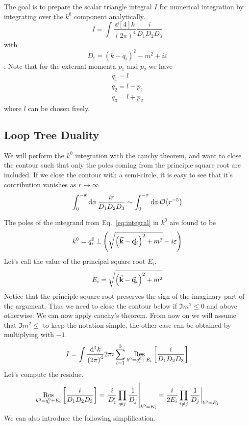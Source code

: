 The goal is to prepare the scalar triangle integral $I$ for numerical integration by integrating over the $k^0$ component analytically.
\begin{equation}
    I = \int \frac{\dd[4]{k}}{{(2\pi)}^4} \frac{i}{D_1D_2D_3} \label{eq:integral}
\end{equation}
with
\begin{equation}
    D_i = {(k-q_i)}^2-m^2+i\varepsilon \label{eq:denom}
\end{equation}.
Note that for the external momenta $p_1$ and $p_2$ we have
\begin{align}
    q_1 = l\\
    q_2 = l - p_1\\
    q_3 = l + p_2
\end{align}
where $l$ can be chosen freely.
\subsection{Loop Tree Duality}
We will perform the $k^0$ integration with the cauchy theorem, and want to close the contour such that only the poles coming from the principle square root are included. If we close the contour with a semi-circle, it is easy to see that it's contribution vanishes as $r \to \infty$
\begin{equation}
    \int_{0}^{-\pi} \dd{\phi} \frac{ir}{D_1D_2D_3} \sim \int_{0}^{-\pi} \dd{\phi} \order{r^{-5}}
\end{equation}

The poles of the integrand from Eq.~\eqref{eq:integral} in $k^0$ are found to be
\begin{equation}
    k^0 = q_i^0 \pm \qty(\sqrt{{\qty(\va{k}-\va{q}_i)}^2+m^2}-i\varepsilon)
\end{equation}
Let's call the value of the principal square root $E_i$.
\begin{equation}
    E_i = \sqrt{{\qty(\va{k}-\va{q}_i)}^2 + m^2}
\end{equation}
Notice that the principle square root preserves the sign of the imaginary part of the argument. Thus we need to close the contour below if $\Im{m^2}\leq0$ and above otherwise. We can now apply cauchy's theorem. From now on we will assume that $\Im{m^2}\leq$ to keep the notation simple, the other case can be obtained by multiplying with $-1$.
\begin{equation}
    I = \int \frac{\dd[4]{k}}{{(2\pi)}^4} 2\pi i \sum_{i= 1}^{3} \On{Res}_{k^0 = q^0_i + E_i}\qty[\frac{i}{D_1D_2D_3}] \label{eq:cauchy}
\end{equation}
Let's compute the residue.
\begin{equation}
    \On{Res}_{k^0 = q^0_i + E_i}\qty[\frac{i}{D_1D_2D_3}] = \eval{\frac{i}{D_i'}\prod_{\neq j} \frac{1}{D_j}}_{k^0=E_i}= \frac{i}{2E_i} \prod_{i\neq j} \eval{\frac{1}{D_j}}_{k^0=E_i} \label{eq:residue}
\end{equation}
We can also introduce the following simplification.

